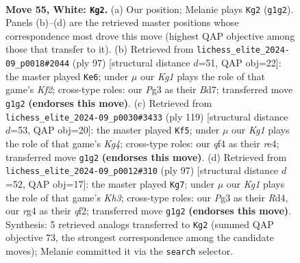 \documentclass[11pt]{article}
\begin{document}
\clearpage

\begin{figure}[p]\centering
\begin{subfigure}{0.46\textwidth}\centering
\resizebox{\linewidth}{!}{%
\newchessgame
\chessboard[
  setfen={8/8/5p2/3p1k2/5qr1/Q5P1/P6P/6K1 w - - 4 55},
  showmover=false,
  pgfstyle=straightmove, color=movearrow, markmove={g1-g2}
]}
\caption{}
\end{subfigure}\hfill
\begin{subfigure}{0.46\textwidth}\centering
\resizebox{\linewidth}{!}{%
\newchessgame
\chessboard[
  setfen={8/R2b1k2/2q5/2pp1pQ1/5P2/7K/6R1/8 b - - 0 49},
  showmover=false,
  pgfstyle=straightmove, color=movearrow, markmove={f7-e6}
]}
\caption{}
\end{subfigure}
\\[4pt]
\begin{subfigure}{0.46\textwidth}\centering
\resizebox{\linewidth}{!}{%
\newchessgame
\chessboard[
  setfen={8/8/3q3p/p2p2k1/4R3/8/6P1/3R3K b - - 5 60},
  showmover=false,
  pgfstyle=straightmove, color=movearrow, markmove={g5-f5}
]}
\caption{}
\end{subfigure}\hfill
\begin{subfigure}{0.46\textwidth}\centering
\resizebox{\linewidth}{!}{%
\newchessgame
\chessboard[
  setfen={8/8/1q3p1k/6p1/3r2Pp/7P/5Q2/5RK1 b - - 5 49},
  showmover=false,
  pgfstyle=straightmove, color=movearrow, markmove={h6-g7}
]}
\caption{}
\end{subfigure}
\caption{\textbf{Move 55, White: \texttt{Kg2}.} (a) Our position; Melanie plays \texttt{Kg2} (\texttt{g1g2}). Panels (b)--(d) are the retrieved master positions whose correspondence most drove this move (highest QAP objective among those that transfer to it). (b) Retrieved from \texttt{lichess\_elite\_2024-09\_p0018\#2044} (ply 97) [structural distance $d$=51, QAP obj=22]: the master played \texttt{Ke6}; under $\mu$ our \emph{Kg1} plays the role of that game's \emph{Kf2}; cross-type roles: our \emph{P}g3 as their \emph{B}d7; transferred move \texttt{g1g2} \textbf{(endorses this move)}. (c) Retrieved from \texttt{lichess\_elite\_2024-09\_p0030\#3433} (ply 119) [structural distance $d$=53, QAP obj=20]: the master played \texttt{Kf5}; under $\mu$ our \emph{Kg1} plays the role of that game's \emph{Kg4}; cross-type roles: our \emph{q}f4 as their \emph{r}e4; transferred move \texttt{g1g2} \textbf{(endorses this move)}. (d) Retrieved from \texttt{lichess\_elite\_2024-09\_p0012\#310} (ply 97) [structural distance $d$=52, QAP obj=17]: the master played \texttt{Kg7}; under $\mu$ our \emph{Kg1} plays the role of that game's \emph{Kh3}; cross-type roles: our \emph{P}g3 as their \emph{R}d4, our \emph{r}g4 as their \emph{q}f2; transferred move \texttt{g1g2} \textbf{(endorses this move)}. Synthesis: 5 retrieved analogs transferred to \texttt{Kg2} (summed QAP objective 73, the strongest correspondence among the candidate moves); Melanie committed it via the \texttt{search} selector.}
\label{fig:thought-m108}
\end{figure}
\end{document}
